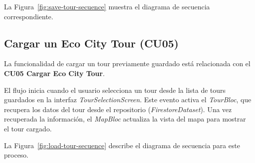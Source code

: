La Figura~\ref{fig:save-tour-secuence} muestra el diagrama de secuencia correspondiente.


\subsection{Cargar un Eco City Tour (CU05)}
La funcionalidad de cargar un tour previamente guardado está relacionada con el \textbf{CU05 Cargar Eco City Tour}.

El flujo inicia cuando el usuario selecciona un tour desde la lista de tours guardados en la interfaz \textit{TourSelectionScreen}. Este evento activa el \textit{TourBloc}, que recupera los datos del tour desde el repositorio (\textit{FirestoreDataset}). Una vez recuperada la información, el \textit{MapBloc} actualiza la vista del mapa para mostrar el tour cargado.

La Figura~\ref{fig:load-tour-secuence} describe el diagrama de secuencia para este proceso.

